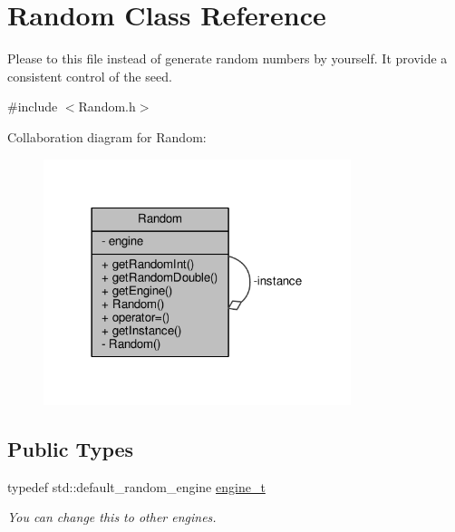 \hypertarget{classRandom}{}\section{Random Class Reference}
\label{classRandom}


Please to this file instead of generate random numbers by yourself. It provide a consistent control of the seed.  




{\ttfamily \#include $<$Random.\+h$>$}



Collaboration diagram for Random\+:
\nopagebreak
\begin{figure}[H]
\begin{center}
\leavevmode
\includegraphics[width=254pt]{classRandom__coll__graph}
\end{center}
\end{figure}
\subsection*{Public Types}
\begin{DoxyCompactItemize}
\item 
typedef std\+::default\+\_\+random\+\_\+engine \hyperlink{classRandom_ab1090b767f3e771eb8f846079869d1b4}{engine\+\_\+t}
\begin{DoxyCompactList}\small\item\em You can change this to other engines. \end{DoxyCompactList}\end{DoxyCompactItemize}
